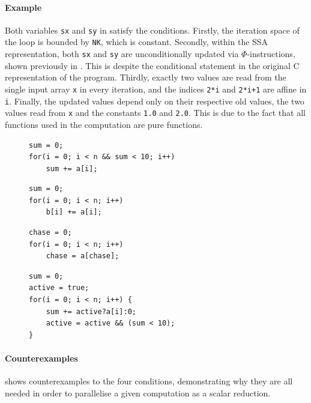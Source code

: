     \paragraph*{Example}
    Both variables \texttt{sx} and \texttt{sy} in
     satisfy the conditions.
    Firstly, the iteration space of the loop is bounded by \texttt{NK}, which is
    constant.
    Secondly, within the SSA representation, both \texttt{sx} and \texttt{sy}
    are unconditionally updated via $\Phi$-instructions, shown previously in
    .
    This is despite the conditional statement in the original C representation
    of the program.
    Thirdly, exactly two values are read from the single input array \texttt{x}
    in every iteration, and the indices \texttt{2*i} and \texttt{2*i+1} are
    affine in \texttt{i}.
    Finally, the updated values depend only on their respective old values,
    the two values read from \texttt{x} and the constants \texttt{1.0} and
    \texttt{2.0}.
    This is due to the fact that all functions used in the computation are pure
    functions.

\begin{figure}[t]
\begin{lstlisting}[language=MyCpp]
sum = 0;
for(i = 0; i < n && sum < 10; i++)
    sum += a[i];
\end{lstlisting}
\begin{lstlisting}[language=MyCpp]
sum = 0;
for(i = 0; i < n; i++)
    b[i] += a[i];
\end{lstlisting}
\begin{lstlisting}[language=MyCpp]
chase = 0;
for(i = 0; i < n; i++)
    chase = a[chase];
\end{lstlisting}
\begin{lstlisting}[language=MyCpp,label={counterexamples},caption=
   {Counterexamples to the four conditions: None of these computations can be
    parallelised as scalar reductions.
    The first and last example implement the same program.}]
sum = 0;
active = true;
for(i = 0; i < n; i++) {
    sum += active?a[i]:0;
    active = active && (sum < 10);
}
\end{lstlisting}
\end{figure}

    \paragraph*{Counterexamples}
     shows counterexamples to the four conditions,
    demonstrating why they are all needed in order to parallelise a given
    computation as a scalar reduction.

